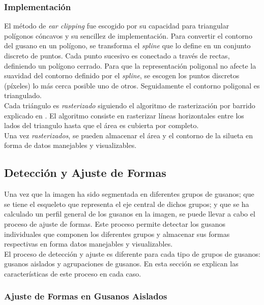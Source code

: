\subsubsection*{Implementaci\'on}

El m\'etodo de \emph{ear clipping} fue escogido por su capacidad para triangular pol\'igonos
c\'oncavos y su sencillez de implementaci\'on. Para convertir el contorno del gusano en un 
pol\'igono, se transforma el \emph{spline} que lo define en un conjunto discreto de puntos.
Cada punto sucesivo es conectado a trav\'es de rectas, definiendo un pol\'igono cerrado. 
Para que la representaci\'on poligonal no afecte la suavidad del contorno definido por el
\emph{spline}, se escogen los puntos discretos (p\'ixeles) lo m\'as cerca posible uno de otros.
Seguidamente el contorno poligonal es triangulado.\\

Cada tri\'angulo es \emph{rasterizado} siguiendo el algoritmo de rasterizaci\'on por barrido
explicado en \cite{scanconversion}. El algoritmo consiste en rasterizar 
l\'ineas horizontales entre los lados del triangulo hasta que el \'area es cubierta por completo.\\

Una vez \emph{rasterizados}, se pueden almacenar el \'area y el contorno de la silueta en
forma de datos manejables y visualizables. 

\subsection{Detecci\'on y Ajuste de Formas}
\label{sec:metfit}

Una vez que la imagen ha sido segmentada en diferentes grupos de gusanos; que se tiene
el esqueleto que representa el eje central de dichos grupos; y que se ha calculado un
perfil general de los gusanos en la imagen, se puede llevar a cabo el proceso de ajuste
de formas. Este proceso permite detectar los gusanos individuales que componen los 
diferentes grupos y almacenar sus formas respectivas en forma datos manejables y visualizables.\\

El proceso de detecci\'on y ajuste es diferente para cada tipo de grupos de gusanos: 
gusanos aislados y agrupaciones de gusanos. En esta secci\'on se explican las 
caracter\'isticas de este proceso en cada caso.

\subsubsection*{Ajuste de Formas en Gusanos Aislados}
\label{sec:metiso}

